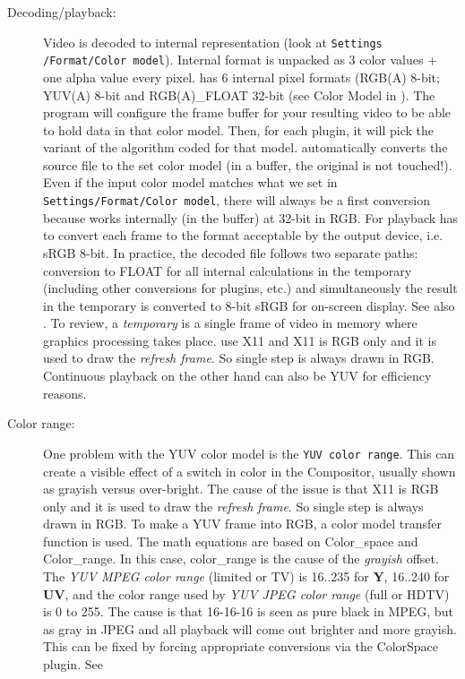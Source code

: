 \begin{description}
	\item[Decoding/playback:] Video is decoded to internal representation (look at \texttt{Settings /Format/Color model}). Internal format is unpacked as 3 color values + one alpha value every pixel. \CGG{} has 6 internal pixel formats (RGB(A) 8-bit; YUV(A) 8-bit and RGB(A)\_FLOAT 32-bit (see Color Model in ). The program will configure the frame buffer for your resulting video to be able to hold data in that color model. Then, for each plugin, it will pick the variant of the algorithm coded for that model.
	\CGG{} automatically converts the source file to the set color model (in a buffer, the original is not touched!). Even if the input color model matches what we set in \texttt{Settings/Format/Color model}, there will always be a first conversion because \CGG{} works internally (in the buffer) at 32-bit in RGB. For playback \CGG{} has to convert each frame to the format acceptable by the output device, i.e. sRGB 8-bit. In practice, the decoded file follows two separate paths: conversion to FLOAT for all internal calculations in the temporary (including other conversions for plugins, etc.) and simultaneously the result in the temporary is converted to 8-bit sRGB for on-screen display. See also . To review, a \textit{temporary} is a single frame of
video in memory where graphics processing takes place.
\CGG{} use X11 and X11 is RGB only and it is used to draw the \textit{refresh frame}. So single step is always drawn in RGB. Continuous playback on the other hand can also be YUV for efficiency reasons.
	\item[Color range:] One problem with the YUV color model is the \texttt{YUV color range}. This can create a visible effect of a switch in color in the Compositor, usually shown as grayish versus over-bright. The cause of the issue is that X11 is RGB only and it is used to draw the \textit{refresh frame}. So single step is always drawn in RGB. To make a YUV frame into RGB, a color model transfer function is used. The math equations are based on Color\_space and Color\_range. In this case, color\_range is the cause of the \textit{grayish} offset. The \textit{YUV MPEG color range} (limited or TV) is 16..235 for \textbf{Y}, 16..240 for \textbf{UV}, and the color range used by \textit{YUV JPEG color range} (full or HDTV) is 0 to 255. The cause is that 16-16-16 is seen as pure black in MPEG, but as gray in JPEG and all playback will come out brighter and more grayish. This can be fixed by forcing appropriate conversions via the ColorSpace plugin. See 

\end{description}
